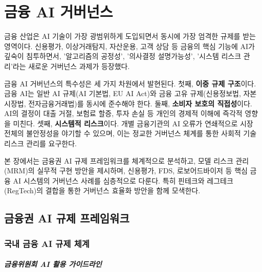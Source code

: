 
\chapter{금융 AI 거버넌스}
\label{ch:finance_governance}

금융 산업은 AI 기술이 가장 광범위하게 도입\cite{enholm2022artificial}되면서 동시에 가장 엄격한 규제를 받는 영역이다. 신용평가\cite{oecd2021ai}, 이상거래탐지\cite{cao2022ai}, 자산운용, 고객 상담 등 금융의 핵심 기능에 AI가 깊숙이 침투하면서, '알고리즘의 공정성\cite{barocas2016big}', '의사결정 설명가능성\cite{bracke2019machine}', '시스템 리스크 관리'라는 새로운 거버넌스 과제가 등장했다.

금융 AI 거버넌스의 특수성은 세 가지 차원에서 발현된다. 첫째, \textbf{이중 규제 구조}이다. 금융 AI는 일반 AI 규제(AI 기본법, EU\cite{eba2020big} AI Act)와 금융 고유 규제(신용정보법, 자본시장법, 전자금융거래법)를 동시에 준수해야 한다. 둘째, \textbf{소비자 보호의 직접성\cite{angwin2016machine}}이다. AI의 결정이 대출 거절, 보험료 할증, 투자 손실 등 개인의 경제적 이해에 즉각적 영향을 미친다. 셋째, \textbf{시스템적 리스크}이다. 개별 금융기관의 AI 오류가 연쇄적으로\cite{novelli2023taking} 시장 전체의 불안정성을 야기할 수 있으며, 이는 정교한 거버넌스 체계를 통한 사회적 기술 리스크 관리를 요구한다.\cite{falco2021governing}

본 장에서는 금융권 AI 규제 프레임워크를 체계적으로 분석하고, 모델 리스크 관리(MRM)의 실무적 구현 방안을 제시하며, 신용평가, FDS, 로보어드바이저\cite{dixon2020machine} 등 핵심 금융 AI 시스템의 거버넌스 사례를 심층적으로 다룬다. 특히 핀테크\cite{philippon2020fintech}와 레그테크(RegTech)의 결합\cite{lins2021artificial}을 통한 거버넌스 효율화 방안을 함께 모색한다.\cite{arner2017fintech}

\section{금융권 AI 규제 프레임워크}
\label{sec:17.1}

\subsection{국내 금융 AI 규제 체계}
\label{sec:17.1.1}

\paragraph{금융위원회 AI 활용 가이드라인}

